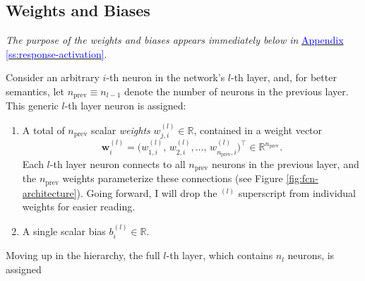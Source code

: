 \documentclass[11pt, a4paper]{article}
\newcommand{\myhref}[2]{\hyperref[#1]{\textcolor{blue}{#2}}}
\renewcommand{\vec}[1]{\bm{#1}}
\newcommand{\w}{\vec{w}}
\begin{document}
\subsection{Weights and Biases}
\small{\textit{The purpose of the weights and biases appears immediately below in} \myhref{ss:response-activation}{Appendix \ref{ss:response-activation}}.}

\vspace{2mm}
Consider an arbitrary $ i $-th neuron in the network's $ l $-th layer, and, for better semantics, let $ n_{\text{prev}} \equiv n_{l - 1} $ denote the number of neurons in the previous layer. This generic $ l $-th layer neuron is assigned:
\begin{enumerate}

    \item A total of $ n_{\text{prev}} $ scalar \textit{weights} $ w_{j,i}^{(l)} \in \mathbb{R} $, contained in a weight vector
    \begin{equation}
        \w_{i}^{(l)} = \Big(w_{1, i}^{(l)}, \, w_{2, i}^{(l)}, \ldots, \, w_{n_{\text{prev}}, i}^{(l)}\Big)^{\top} \in \mathbb{R}^{n_{\text{prev}}}. \label{eq:weight-vector}
    \end{equation}
    Each $ l $-th layer neuron connects to all $ n_{\text{prev}} $ neurons in the previous layer, and the $ n_{\text{prev}} $ weights parameterize these connections (see Figure \ref{fig:fcn-architecture}). Going forward, I will drop the $ {}^{(l)} $ superscript from individual weights for easier reading.


    \item A single scalar bias $ b^{(l)}_{i} \in \mathbb{R} $.

\end{enumerate}
Moving up in the hierarchy, the full $ l $-th layer, which contains $ n_{l} $ neurons, is assigned
\end{document}
